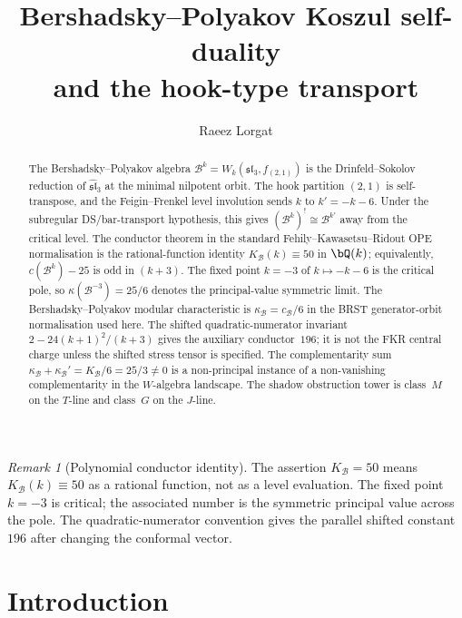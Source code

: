 \documentclass[11pt]{article}
\title{Bershadsky--Polyakov Koszul self-duality\\
and the hook-type transport}
\author{Raeez Lorgat}
\date{}
\theoremstyle{plain}
\theoremstyle{definition}
\theoremstyle{remark}
\newtheorem{remark}[theorem]{Remark}
\newcommand{\fsl}{\mathfrak{sl}}
\newcommand{\cB}{\mathcal{B}}
\numberwithin{equation}{section}
\begin{document}
\maketitle


\begin{abstract}
The Bershadsky--Polyakov algebra $\cB^k = W_k(\fsl_3, f_{(2,1)})$
is the Drinfeld--Sokolov reduction of $\widehat{\fsl}_3$ at the
minimal nilpotent orbit. The hook partition $(2,1)$ is self-transpose,
and the Feigin--Frenkel level involution sends $k$ to
$k'=-k-6$. Under the subregular DS/bar-transport hypothesis, this
gives $(\cB^k)^! \cong \cB^{k'}$ away from the critical level. The
conductor theorem in the standard Fehily--Kawasetsu--Ridout OPE
normalisation is the rational-function identity
$K_{\cB}(k)\equiv 50$ in $\bQ(k)$; equivalently,
$c(\cB^k)-25$ is odd in $(k+3)$. The fixed point $k=-3$ of
$k\mapsto -k-6$ is the critical pole, so
$\kappa(\cB^{-3})=25/6$ denotes the principal-value symmetric
limit. The Bershadsky--Polyakov modular characteristic is
 $\kappa_{\cB}=c_{\cB}/6$ in the BRST generator-orbit
 normalisation used here. The shifted quadratic-numerator invariant
$2-24(k+1)^2/(k+3)$ gives the auxiliary conductor~$196$; it is not
the FKR central charge unless the shifted stress tensor is specified.
The complementarity sum $\kappa_{\cB} + \kappa_{\cB}' = K_{\cB}/6 = 25/3 \neq 0$
 is a non-principal instance of a non-vanishing complementarity
in the $W$-algebra landscape. The shadow obstruction tower is class~$M$
on the $T$-line and class~$G$ on the $J$-line.
\end{abstract}

\begin{remark}[Polynomial conductor identity]\label{rem:bp-polynomial-conductor}
The assertion $K_{\cB}=50$ means
$K_{\cB}(k)\equiv50$ as a rational function, not as a level
evaluation. The fixed point $k=-3$ is critical; the associated number
is the symmetric principal value across the pole. The
quadratic-numerator convention gives the parallel shifted constant
$196$ after changing the conformal vector.
\end{remark}

\section{Introduction}\label{sec:intro}
\end{document}
